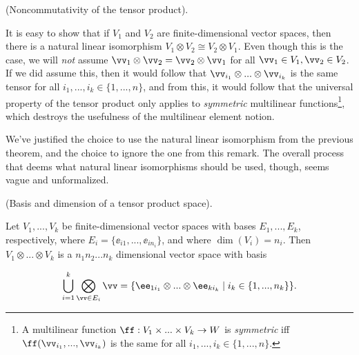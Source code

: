 \begin{remark}
    (Noncommutativity of the tensor product).

    It is easy to show that if $V_1$ and $V_2$ are finite-dimensional vector spaces, then there is a natural linear isomorphism $V_1 \otimes V_2 \cong V_2 \otimes V_1$. Even though this is the case, we will \textit{not} assume $\vv_1 \otimes \vv_2 = \vv_2 \otimes \vv_1$ for all $\vv_1 \in V_1, \vv_2 \in V_2$. If we did assume this, then it would follow that $\vv_{i_1} \otimes ... \otimes \vv_{i_k}$ is the same tensor for all $i_1, ..., i_k \in \{1, ..., n\}$, and from this, it would follow that the universal property of the tensor product only applies to \textit{symmetric} multilinear functions\footnote{A multilinear function $\ff:V_1 \times ... \times V_k \rightarrow W$ is \textit{symmetric} iff $\ff(\vv_{i_1}, ..., \vv_{i_k})$ is the same for all $i_1, ..., i_k \in \{1, ..., n\}$.}, which destroys the usefulness of the multilinear element notion.

    We've justified the choice to use the natural linear isomorphism from the previous theorem, and the choice to ignore the one from this remark. The overall process that deems what natural linear isomorphisms should be used, though, seems vague and unformalized.
\end{remark}

\begin{theorem}
\label{ch::motivated_intro::thm::basis_dim_tensor_product_space}
    (Basis and dimension of a tensor product space). 
    
    Let $V_1, ..., V_k$ be finite-dimensional vector spaces with bases $E_1, ..., E_k$, respectively, where $E_i = \{\ee_{i1}, ..., \ee_{in_i}\}$, and where $\dim(V_i) = n_i$. Then $V_1 \otimes ... \otimes V_k$ is a $n_1 n_2 ... n_k$ dimensional vector space with basis
    
    \begin{align*}
        \bigcup_{i = 1}^k \bigotimes_{\vv \in E_i} \vv = 
        \{ \ee_{1i_1} \otimes ... \otimes \ee_{ki_k} \mid i_k \in \{1, ..., n_k\} \}.
    \end{align*}
\end{theorem}

